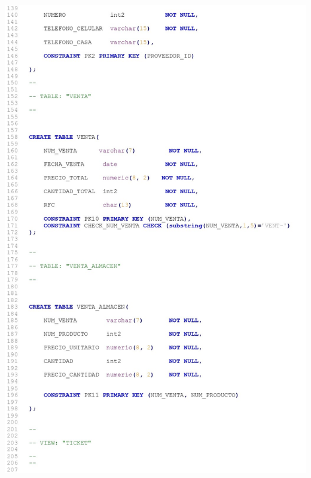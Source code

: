 \documentclass[letter,12pt]{article} %
\begin{document}
\includegraphics[scale=0.85]{imagenes/DDL3.jpg}
\newpage
\end{document}
